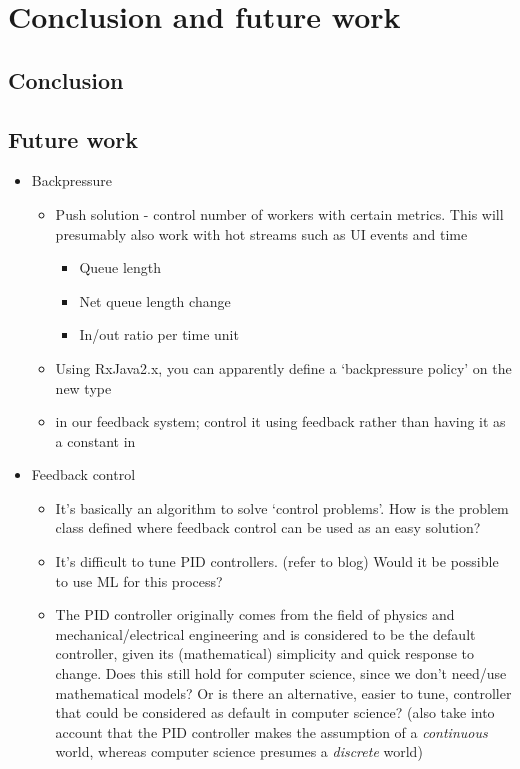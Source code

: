 \chapter{Conclusion and future work}

\section{Conclusion}

\section{Future work}
\begin{itemize}
	\item Backpressure
	\begin{itemize}
		\item Push solution - control number of workers with certain metrics. This will presumably also work with hot streams such as UI events and time
		\begin{itemize}
			\item Queue length
			\item Net queue length change
			\item In/out ratio per time unit
		\end{itemize}
		\item Using RxJava2.x, you can apparently define a `backpressure policy' on the new  type
		\item {} in our feedback system; control it using feedback rather than having it as a constant in 
	\end{itemize}
	\item Feedback control
	\begin{itemize}
		\item It’s basically an algorithm to solve ‘control problems’. How is the problem class defined where feedback control can be used as an easy solution?
		\item It’s difficult to tune PID controllers. (refer to blog) Would it be possible to use ML for this process?
		\item The PID controller originally comes from the field of physics and mechanical/electrical engineering and is considered to be the default controller, given its (mathematical) simplicity and quick response to change. Does this still hold for computer science, since we don’t need/use mathematical models? Or is there an alternative, easier to tune, controller that could be considered as default in computer science? (also take into account that the PID controller makes the assumption of a \textit{continuous} world, whereas computer science presumes a \textit{discrete} world)

\end{itemize}
\end{itemize}
